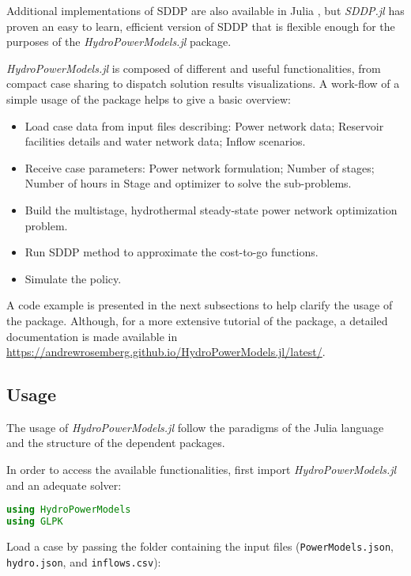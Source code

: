 \documentclass{juliacon}
\begin{document}
Additional implementations of SDDP are also available in Julia \cite{leclerestochdynamicprogramming} \cite{StructDualDynProg}, but \textit{SDDP.jl} \cite{dowson_sddp.jl} has proven an easy to learn, efficient version of SDDP that is flexible enough for the purposes of the \textit{HydroPowerModels.jl} package.

\textit{HydroPowerModels.jl} is composed of different and useful functionalities, from compact case sharing to dispatch solution results visualizations. A work-flow of a simple usage of the package helps to give a basic overview:

\begin{itemize}
    \item Load case data from input files describing: Power network data; Reservoir facilities details and water network data; Inflow scenarios.
    \item Receive case parameters: Power network formulation; Number of stages; Number of hours in Stage and optimizer to solve the sub-problems. 
    \item Build the multistage, hydrothermal steady-state power network optimization problem.
    \item Run SDDP method to approximate the cost-to-go functions.
    \item Simulate the policy.
\end{itemize}

A code example is presented in the next subsections to help clarify the usage of the package. Although, for a more extensive tutorial of the package, a detailed documentation is made available in \url{https://andrewrosemberg.github.io/HydroPowerModels.jl/latest/}.

\subsection{Usage}
\label{subsub:usagehpm}
The usage of \textit{HydroPowerModels.jl} follow the paradigms of the Julia language and the structure of the dependent packages.

In order to access the available functionalities, first import \textit{HydroPowerModels.jl} and an adequate solver:

\begin{lstlisting}[language = Julia]
using HydroPowerModels
using GLPK
\end{lstlisting}

Load a case by passing the folder containing the input files (\texttt{PowerModels.json}, \texttt{hydro.json}, and \texttt{inflows.csv}):
\end{document}
